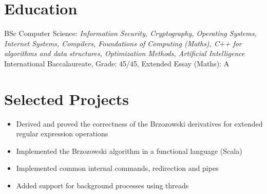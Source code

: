 \documentclass{resume}
\begin{document}



\section{Education}
BSc Computer Science: \textit{Information Security, Cryptography, Operating Systems, Internet Systems, Compilers, Foundations of Computing (Maths),
C++ for algorithms and data structures, Optimization Methods, Artificial Intelligence}
International Baccalaureate, Grade: 45/45, Extended Essay (Maths): A


\section{Selected Projects}

\begin{itemize}
  \item Derived and proved the correctness of the Brzozowski derivatives for extended regular expression operations
  \item Implemented the Brzozowski algorithm in a functional language (Scala)
\end{itemize}

\begin{itemize}
  \item Implemented common internal commands, redirection and pipes
  \item Added support for background processes using threads
\end{itemize}
\end{document}
